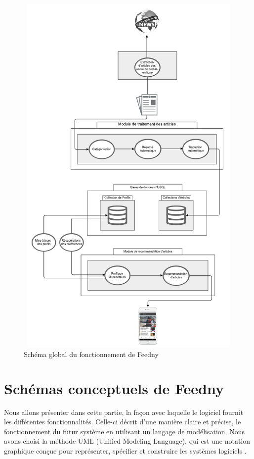 \begin{figure}[H]
    \centering
    \includegraphics[height=520pt,width=380pt]{img/chapter3/global.png}
    \caption{Schéma global du fonctionnement de \textquotedbl Feedny\textquotedbl }
    \label{shemaglobal}
\end{figure}

\section{Schémas conceptuels de \textquotedbl Feedny\textquotedbl }
Nous allons présenter dans cette partie, la façon avec laquelle le logiciel fournit les différentes fonctionnalités. Celle-ci décrit d'une manière claire et précise, le fonctionnement du futur système en utilisant un langage de modélisation. Nous avons choisi la méthode UML (Unified Modeling Language), qui est une notation graphique conçue pour représenter, spécifier et construire les systèmes logiciels \cite{UML}.


